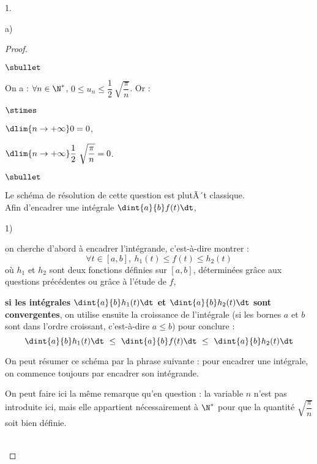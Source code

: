 \documentclass[11pt]{article}%
\begin{document}
\begin{noliste}{1.}
\begin{noliste}{a)}
\begin{proof}
\begin{noliste}{$\sbullet$}
        \newpage
        
        
      \item On a : $\forall n \in \N^*$, $0 \leq u_n \leq \dfrac{1}{2}
        \ \sqrt{\dfrac{\pi}{n}}$. Or :
        \begin{noliste}{$\stimes$}
        \item $\dlim{n \to +\infty} 0 = 0$,
          
        \item $\dlim{n \to +\infty} \dfrac{1}{2} \
          \sqrt{\dfrac{\pi}{n}} = 0$.
        \end{noliste}
      \end{noliste}
      \begin{remark}
        \begin{noliste}{$\sbullet$}
        \item Le schéma de résolution de cette question est plutÃ´t
          classique.\\
          Afin d'encadrer une intégrale $\dint{a}{b} f(t) \dt$,
          \begin{noliste}{\scriptsize 1)}
          \item on cherche d'abord à encadrer l'intégrande,
            c'est-à-dire montrer :
            \[
              \forall t \in [a,b], \ h_1(t) \leq f(t) \leq h_2(t)
            \]
            où $h_1$ et $h_2$ sont deux fonctions définies sur
            $[a,b]$, déterminées grâce aux questions précédentes ou
            grâce à l'étude de $f$,
            
          \item {\bf si les intégrales $\dint{a}{b} h_1(t) \dt$ et
              $\dint{a}{b} h_2(t) \dt$ sont convergentes}, on utilise
            ensuite la croissance de l'intégrale (si les bornes $a$ et
            $b$ sont dans l'ordre croissant, c'est-à-dire $a \leq b$)
            pour conclure :
            \[
              \dint{a}{b} h_1(t) \dt \ \leq \ \dint{a}{b} f(t) \dt \
              \leq \ \dint{a}{b} h_2(t) \dt
            \]
          \end{noliste}
          On peut résumer ce schéma par la phrase suivante : pour
          encadrer une intégrale, on commence
          toujours par encadrer son intégrande.
        
        \item On peut faire ici la même remarque qu'en question
           : la variable $n$ n'est pas introduite ici, mais
          elle appartient nécessairement à $\N^*$ pour que la quantité
          $\sqrt{\dfrac{\pi}{n}}$ soit bien définie.  
        \end{noliste}
      \end{remark}~\\[-1.4cm]
    \end{proof}
  \end{noliste}
  

\end{noliste}
\end{document}

